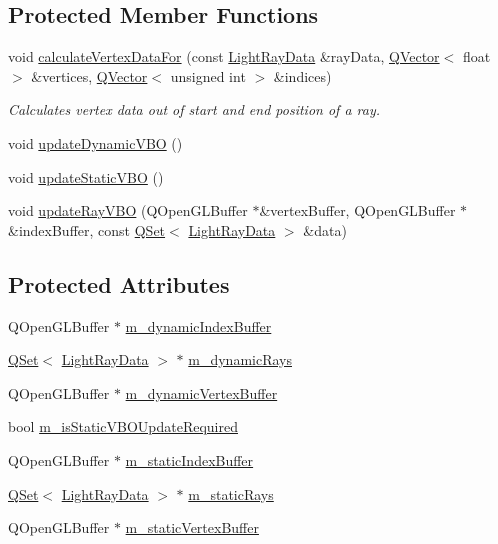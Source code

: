 \subsection*{Protected Member Functions}
\begin{DoxyCompactItemize}
\item 
void \hyperlink{class_light_ray_renderer_a6f7367b897a492fd021ea2ae43053cef}{calculate\+Vertex\+Data\+For} (const \hyperlink{class_light_ray_data}{Light\+Ray\+Data} \&ray\+Data, \hyperlink{singleton_q_vector}{Q\+Vector}$<$ float $>$ \&vertices, \hyperlink{singleton_q_vector}{Q\+Vector}$<$ unsigned int $>$ \&indices)
\begin{DoxyCompactList}\small\item\em Calculates vertex data out of start and end position of a ray. \end{DoxyCompactList}\item 
void \hyperlink{class_light_ray_renderer_aa60b1a942ae0b926f4126836dc19ea21}{update\+Dynamic\+V\+B\+O} ()
\item 
void \hyperlink{class_light_ray_renderer_a26948ed2a22fac94af809d293cecf135}{update\+Static\+V\+B\+O} ()
\item 
void \hyperlink{class_light_ray_renderer_a3e31cf1e12e66f170cb34d3620983c7c}{update\+Ray\+V\+B\+O} (Q\+Open\+G\+L\+Buffer $\ast$\&vertex\+Buffer, Q\+Open\+G\+L\+Buffer $\ast$\&index\+Buffer, const \hyperlink{singleton_q_set}{Q\+Set}$<$ \hyperlink{class_light_ray_data}{Light\+Ray\+Data} $>$ \&data)
\end{DoxyCompactItemize}
\subsection*{Protected Attributes}
\begin{DoxyCompactItemize}
\item 
Q\+Open\+G\+L\+Buffer $\ast$ \hyperlink{class_light_ray_renderer_afe1bab9c62f8e91c45df4680f1f878a9}{m\+\_\+dynamic\+Index\+Buffer}
\item 
\hyperlink{singleton_q_set}{Q\+Set}$<$ \hyperlink{class_light_ray_data}{Light\+Ray\+Data} $>$ $\ast$ \hyperlink{class_light_ray_renderer_a829e8b67018149941b5e349c336be865}{m\+\_\+dynamic\+Rays}
\item 
Q\+Open\+G\+L\+Buffer $\ast$ \hyperlink{class_light_ray_renderer_ae8c0c8b69c3dda2e8e535f3c7da7543f}{m\+\_\+dynamic\+Vertex\+Buffer}
\item 
bool \hyperlink{class_light_ray_renderer_a9931d2944cabf289973c862a714fc5fd}{m\+\_\+is\+Static\+V\+B\+O\+Update\+Required}
\item 
Q\+Open\+G\+L\+Buffer $\ast$ \hyperlink{class_light_ray_renderer_ab78cd6dadbb241b4d8929f5f1b60995a}{m\+\_\+static\+Index\+Buffer}
\item 
\hyperlink{singleton_q_set}{Q\+Set}$<$ \hyperlink{class_light_ray_data}{Light\+Ray\+Data} $>$ $\ast$ \hyperlink{class_light_ray_renderer_a6524c19725083f59fe41616998dcf111}{m\+\_\+static\+Rays}
\item 
Q\+Open\+G\+L\+Buffer $\ast$ \hyperlink{class_light_ray_renderer_af21bb4b6a08c84b13753860a0a89b199}{m\+\_\+static\+Vertex\+Buffer}
\end{DoxyCompactItemize}


